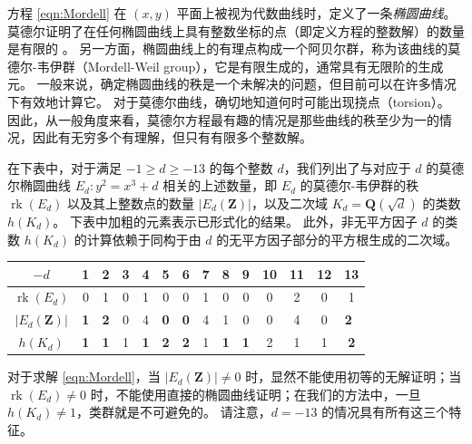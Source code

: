 \documentclass[sigplan,10pt,nonacm,
screen]{acmart} \settopmatter{printfolios=true,printccs=false,printacmref=false}
\newcommand{\QQ}{\mathbf{Q}}
\newcommand{\ZZ}{\mathbf{Z}}
\DeclareMathOperator{\rk}{rk}
\begin{document}
方程 \eqref{eqn:Mordell} 在 $(x,y)$ 平面上被视为代数曲线时，定义了一条\emph{椭圆曲线}。
莫德尔证明了在任何椭圆曲线上具有整数坐标的点（即定义方程的整数解）的数量是有限的 \cite{mordell23}。
另一方面，椭圆曲线上的有理点构成一个阿贝尔群，称为该曲线的莫德尔-韦伊群（Mordell-Weil group），它是有限生成的，通常具有无限阶的生成元。
一般来说，确定椭圆曲线的秩是一个未解决的问题，但目前可以在许多情况下有效地计算它。
对于莫德尔曲线，确切地知道何时可能出现挠点（torsion）。
因此，从一般角度来看，莫德尔方程最有趣的情况是那些曲线的秩至少为一的情况，因此有无穷多个有理解，但只有有限多个整数解。

在下表中，对于满足 $-1 \geq d \geq -13$ 的每个整数 $d$，我们列出了与对应于 $d$ 的莫德尔椭圆曲线 $E_d : y^2 = x^3 + d$ 相关的上述数量，即 $E_d$ 的莫德尔-韦伊群的秩 $\rk(E_d)$ 以及其上整数点的数量 $|E_d(\ZZ)|$，以及二次域 $K_d=\QQ(\sqrt{d})$ 的类数 $h(K_d)$。
下表中加粗的元素表示已形式化的结果。
此外，非无平方因子 $d$ 的类数 $h(K_d)$ 的计算依赖于同构于由 $d$ 的无平方因子部分的平方根生成的二次域。
\begin{center}
	\tabcolsep=0.15cm
	\begin{tabular}{c|c|c|c|c|c|c|c|c|c|c|c|c|c}
		$-d$          & 1                         & 2                         & 3 & 4 & 5                         & 6                         & 7 & 8 & 9 & 10 & 11 & 12 & 13                    \\ \hline
		$\rk(E_d)$     & 0                         & 1                         & 0 & 1 & 0                         & 0                         & 1 & 0 & 0 & 0  & 2  & 0  & 1              \\ \hline
		$|E_d(\ZZ)| $ & \textbf{1}                         & \textbf{2}                         & 0 & 4 & \textbf{0}                         & \textbf{0}                         & 4 & 1 & 0 & 0  & 4  & 0  & \textbf{2}\   \\ \hline
		$h(K_d)$      & \textbf{1}                         & \textbf{1}                         & 1 & \textbf{1} & \textbf{2}                         & \textbf{2}                         & 1 & \textbf{1} & \textbf{1} & 2  & 1  & 1  & \textbf{2}            \\
	\end{tabular}
\end{center}
对于求解 \eqref{eqn:Mordell}，当 $|E_d(\ZZ)|\not=0$ 时，显然不能使用初等的无解证明；当 $\rk(E_d)\not=0$ 时，不能使用直接的椭圆曲线证明；在我们的方法中，一旦 $h(K_d)\not=1$，类群就是不可避免的。
请注意，$d=-13$ 的情况具有所有这三个特征。
\end{document}
